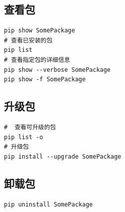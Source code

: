 \subsection{查看包}
\begin{lstlisting}[style=demostyle,numbers=none]
pip show SomePackage
# 查看已安装的包
pip list
# 查看指定包的详细信息
pip show --verbose SomePackage
pip show -f SomePackage
\end{lstlisting}

\subsection{升级包}
\begin{lstlisting}[style=demostyle,numbers=none]
#  查看可升级的包
pip list -o
# 升级包
pip install --upgrade SomePackage
\end{lstlisting}

\subsection{卸载包}
\begin{lstlisting}[style=demostyle,numbers=none]
pip uninstall SomePackage
\end{lstlisting}
